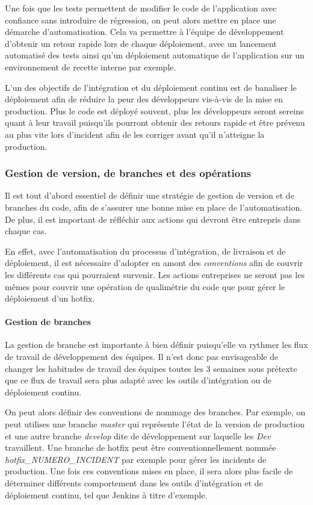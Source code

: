 Une fois que les tests permettent de modifier le code de l'application avec confiance sans introduire de régression, on peut alors mettre en place une démarche d'automatisation. Cela va permettre à l'équipe de développement d'obtenir un retour rapide lors de chaque déploiement, avec un lancement automatisé des tests ainsi qu'un déploiement automatique de l'application sur un environnement de recette interne par exemple.

L'un des objectifs de l'intégration et du déploiement continu est de banaliser le déploiement afin de réduire la peur des développeurs vis-à-vis de la mise en production. Plus le code est déployé souvent, plus les développeurs seront sereins quant à leur travail puisqu'ils pourront obtenir des retours rapide et être prévenu au plus vite lors d'incident afin de les corriger avant qu'il n'atteigne la production.

\subsubsection{Gestion de version, de branches et des opérations}

Il est tout d'abord essentiel de définir une stratégie de gestion de version et de branches du code, afin de s'assurer une bonne mise en place de l'automatisation. De plus, il est important de réfléchir aux actions qui devront être entrepris dans chaque cas. 

En effet, avec l'automatisation du processus d'intégration, de livraison et de déploiement, il est nécessaire d'adopter en amont des \emph{conventions} afin de couvrir les différents cas qui pourraient survenir. Les actions entreprises ne seront pas les mêmes pour couvrir une opération de qualimétrie du code que pour gérer le déploiement d'un \gls{hotfix}.

\paragraph{Gestion de branches}

La gestion de branche est importante à bien définir puisqu'elle va rythmer les flux de travail de développement des équipes. Il n'est donc pas envisageable de changer les habitudes de travail des équipes toutes les 3 semaines sous prétexte que ce flux de travail sera plus adapté avec les outils d'intégration ou de déploiement continu.

On peut alors définir des conventions de nommage des branches. Par exemple, on peut utilises une branche \emph{master} qui représente l'état de la version de production et une autre branche \emph{develop} dite de développement sur laquelle les \emph{Dev} travaillent. Une branche de \gls{hotfix} peut être conventionnellement nommée \emph{hotfix\_NUMERO\_INCIDENT} par exemple pour gérer les incidents de production. Une fois ces conventions mises en place, il sera alors plus facile de déterminer différents comportement dans les outils d'intégration et de déploiement continu, tel que Jenkins à titre d'exemple.

